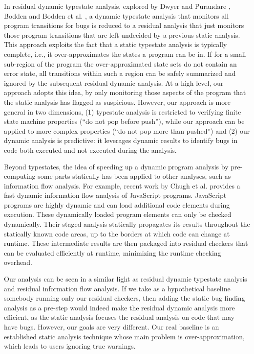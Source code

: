 In residual dynamic typestate analysis, explored by Dwyer and Purandare
\cite{dwyer07residual}, Bodden \cite{bodden10efficient} and Bodden et al.
\cite{bodden07staged}, a dynamic typestate analysis that monitors all
program transitions for bugs is reduced to a residual analysis that
just monitors those program transitions that are left undecided by a
previous static analysis. This approach exploits the fact that a
static typestate analysis is typically complete, i.e., it
over-approximates the states a program can be in. If for a small
sub-region of the program the over-approximated state sets do not
contain an error state, all transitions within such a region can
be safely summarized and ignored by the subsequent residual
dynamic analysis. At a high level, our approach adopts this idea, by
only monitoring those aspects of the program that the static analysis
has flagged as suspicious. However, our approach is more general in
two dimensions, (1) typestate analysis is restricted to verifying
finite state machine properties (``do not pop before push''), while
our approach can be applied to more complex properties (``do not pop
more than pushed'') and (2) our dynamic analysis is predictive: it
leverages dynamic results to identify bugs in code both executed and
not executed during the analysis.

Beyond typestates, the idea of speeding up a dynamic program analysis
by pre-computing some parts statically has been applied to other
analyses, such as information flow analysis. For example, recent work
by Chugh et al. \cite{chugh09staged} provides a fast dynamic
information flow analysis of JavaScript programs. JavaScript programs
are highly dynamic and can load additional code elements during
execution. These dynamically loaded program elements can only be
checked dynamically. Their staged analysis statically propagates its
results throughout the statically known code areas, up to the borders
at which code can change at runtime. These intermediate results are
then packaged into residual checkers that can be evaluated efficiently
at runtime, minimizing the runtime checking overhead.

Our analysis can be seen in a similar light as residual dynamic typestate analysis and residual information flow analysis. If we take as a hypothetical baseline somebody running only our residual checkers, then adding the static bug finding analysis as a pre-step would indeed make the residual dynamic analysis more efficient, as the static analysis focuses the residual analysis on code that may have bugs. However, our goals are very different. Our 
real baseline is an established static analysis technique whose main problem is over-approximation, which leads to users ignoring true warnings. 

